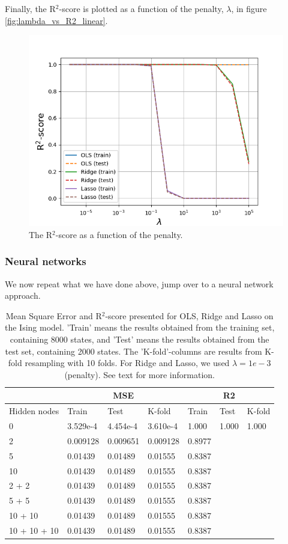 Finally, the R$^2$-score is plotted as a function of the penalty, $\lambda$, in figure \eqref{fig:lambda_vs_R2_linear}.
\begin{figure} [H]
	\centering
	\includegraphics[scale=0.65]{../plots/lambda_vs_R2_linear.png}
	\caption{The R$^2$-score as a function of the penalty. }
	\label{fig:lambda_vs_R2_linear}
\end{figure} 

\subsubsection{Neural networks}
We now repeat what we have done above, jump over to a neural network approach. 
\begin{table} [H]
	\caption{Mean Square Error and R$^2$-score presented for OLS, Ridge and Lasso on the Ising model. 'Train' means the results obtained from the training set, containing 8000 states, and 'Test' means the results obtained from the test set, containing 2000 states. The 'K-fold'-columns are results from K-fold resampling with 10 folds. For Ridge and Lasso, we used $\lambda=1e-3$ (penalty). See text for more information.}
	\begin{tabularx}{\textwidth}{l|XXX|XXX} \hline\hline
		\label{tab:nn}
		& \multicolumn{3}{c}{\textbf{MSE}}&\multicolumn{3}{c}{\textbf{R2}}\\ \hline
		Hidden nodes&Train&Test&K-fold&Train&Test&K-fold\\ \hline
		0 & 3.529e-4 & 4.454e-4 & 3.610e-4 & 1.000 & 1.000 & 1.000\\
		2 & 0.009128 & 0.009651 & 0.009128 & 0.8977 \\
		5 & 0.01439 & 0.01489 & 0.01555 & 0.8387 \\
		10 & 0.01439 & 0.01489 & 0.01555 & 0.8387 \\
		2 + 2 & 0.01439 & 0.01489 & 0.01555 & 0.8387 \\
		5 + 5 & 0.01439 & 0.01489 & 0.01555 & 0.8387 \\ 
		10 + 10 & 0.01439 & 0.01489 & 0.01555 & 0.8387 \\
		10 + 10 + 10 & 0.01439 & 0.01489 & 0.01555 & 0.8387 \\ \hline\hline
	\end{tabularx}
\end{table}

